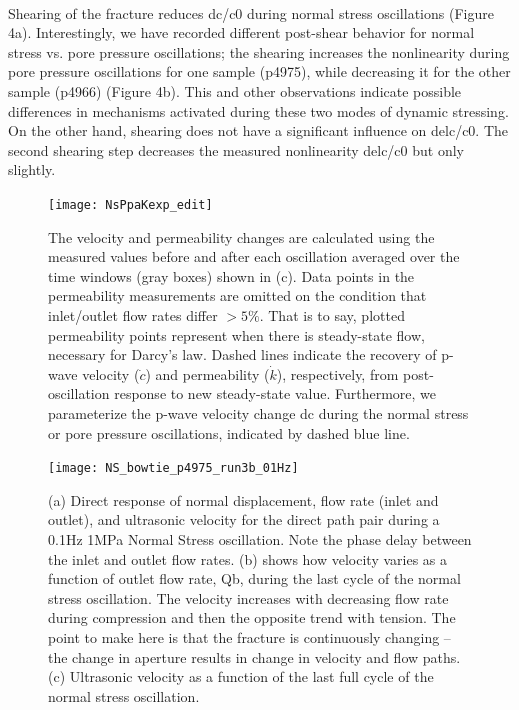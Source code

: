 \documentclass[letterpaper,10pt]{article}
\begin{document}
\paragraph{}
Shearing of the fracture reduces dc/c0 during normal stress oscillations (Figure 4a). Interestingly, we have recorded different post-shear behavior for normal stress vs. pore pressure oscillations; the shearing increases the nonlinearity during pore pressure oscillations for one sample (p4975), while decreasing it for the other sample (p4966) (Figure 4b). This and other observations indicate possible differences in mechanisms activated during these two modes of dynamic stressing. On the other hand, shearing does not have a significant influence on delc/c0. The second shearing step decreases the measured nonlinearity delc/c0 but only slightly.

\newpage

\begin{figure}[ht]
	\centering
	\texttt{[image: NsPpaKexp\_edit]}
	\caption[]{The velocity and permeability changes are calculated using the measured values before and after each oscillation averaged over the time windows (gray boxes) shown in (c). Data points in the permeability measurements are omitted on the condition that inlet/outlet flow rates differ $ > 5 \% $. That is to say, plotted permeability points represent when there is steady-state flow, necessary for Darcy’s law. Dashed lines indicate the recovery of p-wave velocity ($ \dot c$) and permeability ($\dot k$), respectively, from post-oscillation response to new steady-state value. Furthermore, we parameterize the p-wave velocity change dc during the normal stress or pore pressure oscillations, indicated by dashed blue line.}
	\label{fig:delc_delk_calc}
\end{figure}

\newpage

\begin{figure}[h]
	\centering
	\texttt{[image: NS\_bowtie\_p4975\_run3b\_01Hz]}
	\caption[]{(a) Direct response of normal displacement, flow rate (inlet and outlet), and ultrasonic velocity for the direct path pair during a 0.1Hz 1MPa Normal Stress oscillation. Note the phase delay between the inlet and outlet flow rates. (b) shows how velocity varies as a function of outlet flow rate, Qb, during the last cycle of the normal stress oscillation. The velocity increases with decreasing flow rate during compression and then the opposite trend with tension. The point to make here is that the fracture is continuously changing -- the change in aperture results in change in velocity and flow paths. (c) Ultrasonic velocity as a function of the last full cycle of the normal stress oscillation.}
	\label{fig:NS_p4975_run3b_01Hz}
\end{figure}
\end{document}
